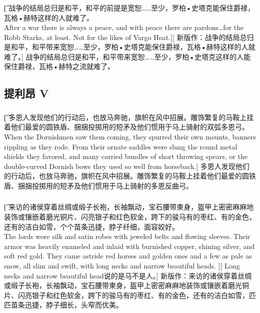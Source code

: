 \documentclass[12pt,a4paper]{article}
\begin{document}
\subsubsection{}\t[		 
	 战争的结局总归是和平，和平的前提是宽恕……至少，罗柏•史塔克能保住爵禄，瓦格•赫特这样的人就难了。\\
	 After a war there is always a peace, and with peace there are pardons\ldots for the Robb Starks, at least. Not for the likes of Vargo Hoat.][
	 新版作：战争的结局总归是和平，和平带来宽恕……至少，罗柏•史塔克能保住爵禄，瓦格•赫特这样的人就难了。]
	 战争的结局总归是和平，和平带来宽恕……至少，罗柏•史塔克这样的人能保住爵禄，瓦格•赫特之流就难了。
	 
\subsection{提利昂 V}
\subsubsection{}\t[
	多恩人发现他们的行动后，也放马奔驰，旗帜在风中招展。雕饰繁复的马鞍上挂着他们最爱的圆铁盾、捆捆投掷用的短矛及他们惯用于马上骑射的双弧多恩弓。\\
	When the Dornishmen saw them coming, they spurred their own mounts, banners rippling as they rode. From their ornate saddles were slung the round metal shields they favored, and many carried bundles of short throwing spears, or the double-curved Dornish bows they used so well from horseback.]
	多恩人发现他们的行动后，也放马奔驰，旗帜在风中招展。雕饰繁复的马鞍上挂着他们最爱的圆铁盾、捆捆投掷用的短矛及他们惯用于马上骑射的多恩反曲弓。
	
\subsubsection{}\t[
	来访的诸侯穿着丝绸或缎子长袍，长袖飘动，宝石腰带柬身，盔甲上密密麻麻地装饰或镶嵌着磨光铜片、闪亮银子和红色软金，跨下的骏马有的枣红、有的金色，还有的洁白如雪，个个苗条迅捷，脖子纤细，面容姣好。\\
	The lords wore silk and satin robes with jeweled belts and flowing sleeves. Their armor was heavily enameled and inlaid with burnished copper, shining silver, and soft red gold. They came astride red horses and golden ones and a few as pale as snow, all slim and swift, with long necks and narrow beautiful heads. ][
	Long necks and narrow beautiful head说的是马不是人。]
	新版作：来访的诸侯穿着丝绸或缎子长袍，长袖飘动，宝石腰带柬身，盔甲上密密麻麻地装饰或镶嵌着磨光铜片、闪亮银子和红色软金，跨下的骏马有的枣红、有的金色，还有的洁白如雪，匹匹苗条迅捷，脖子细长，头窄而优美。
	
\end{document}
